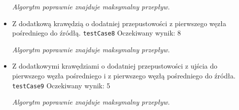 \begin{itemize}[nosep]
    \emph{Algorytm poprawnie znajduje maksymalny przepływ.}

    \item Z dodatkową krawędzią o dodatniej przepustowości z pierwszego węzła
    pośredniego do źródłą.
    \texttt{testCase8}
    Oczekiwany wynik: 8

    \emph{Algorytm poprawnie znajduje maksymalny przepływ.}

    \item Z dodatkowymi krawędziami o dodatniej przepustowości z ujścia do
    pierwszego węzła pośredniego i z pierwszego węzłą pośredniego do źródła.
    \texttt{testCase9}
    Oczekiwany wynik: 5

    \emph{Algorytm poprawnie znajduje maksymalny przepływ.}
\end{itemize}


